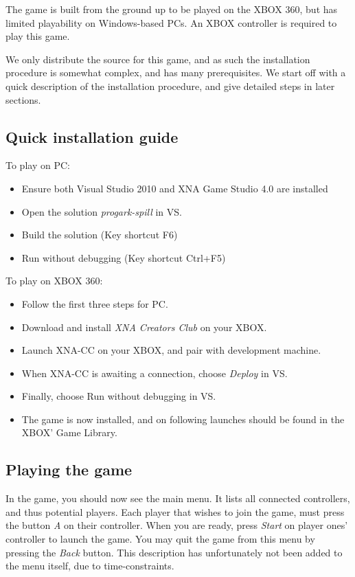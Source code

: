 The game is built from the ground up to be played on the XBOX 360, but
has limited playability on Windows-based PCs.  An XBOX controller is
required to play this game.

We only distribute the source for this game, and as such the installation
procedure is somewhat complex, and has many prerequisites. We start off with
a quick description of the installation procedure, and give detailed steps in
later sections.

\subsection{Quick installation guide}

To play on PC:
\begin{itemize}
    \item Ensure both Visual Studio 2010 and XNA Game Studio 4.0 are installed
    \item Open the solution \emph{progark-spill} in VS.
    \item Build the solution (Key shortcut F6)
    \item Run without debugging (Key shortcut Ctrl+F5)
\end{itemize}

To play on XBOX 360:
\begin{itemize}
    \item Follow the first three steps for PC.
    \item Download and install \emph{XNA Creators Club} on your XBOX.
    \item Launch XNA-CC on your XBOX, and pair with development machine.
    \item When XNA-CC is awaiting a connection, choose \emph{Deploy} in
          VS.
    \item Finally, choose Run without debugging in VS.
    \item The game is now installed, and on following launches should
          be found in the XBOX' Game Library.
\end{itemize}

\subsection{Playing the game}

In the game, you should now see the main menu. It lists all connected 
controllers, and thus potential players. Each player that wishes to join the
game, must press the button \emph{A} on their controller. When you are ready,
press \emph{Start} on player ones' controller to launch the game.  You may quit 
the game from this menu by pressing the \emph{Back} button.  This
description has unfortunately not been added to the menu itself, due to
time-constraints.

